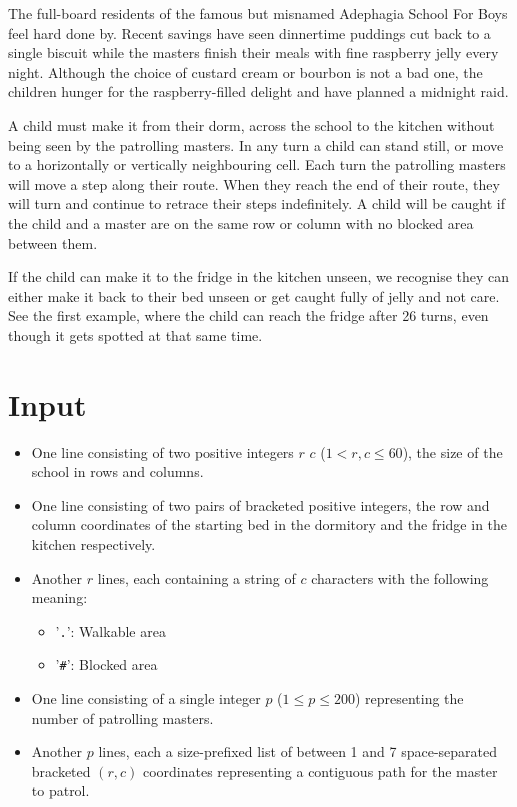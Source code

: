 
The full-board residents of the famous but misnamed Adephagia School For Boys feel
hard done by. Recent savings have seen dinnertime puddings cut back to a single
biscuit while the masters finish their meals with fine raspberry jelly every
night. Although the choice of custard cream or bourbon is not a bad one, the
children hunger for the raspberry-filled delight and have planned a midnight
raid.

A child must make it from their dorm, across the school to the kitchen without
being seen by the patrolling masters. In any turn a child can stand still, or
move to a horizontally or vertically neighbouring cell. Each turn the
patrolling masters will move a step along their route. When they reach the end
of their route, they will turn and continue to retrace their steps
indefinitely. A child will be caught if the child and a master are on the same
row or column with no blocked area between them.

If the child can make it to the fridge in the kitchen unseen, we recognise they
can either make it back to their bed unseen or get caught fully of jelly and
not care. See the first example, where the child can reach the fridge
after 26 turns, even though it gets spotted at that same time.

\section*{Input}

\begin{itemize}

\item One line consisting of two positive integers $r$ $c$ ($1 < r, c \leq 60$),
the size of the school in rows and columns.

\item One line consisting of two pairs of bracketed positive integers, the row
and column coordinates of the starting bed in the dormitory and the fridge in
the kitchen respectively.

\item Another $r$ lines, each containing a string of $c$ characters with the
following meaning:

\begin{itemize}
  \item '\texttt{.}': Walkable area
  \item '\texttt{\#}': Blocked area
\end{itemize}

\item One line consisting of a single integer $p$ ($1 \le p \le 200$)
representing the number of patrolling masters.

\item Another $p$ lines, each a size-prefixed list of between 1 and 7
space-separated bracketed $(r, c)$ coordinates representing a contiguous path
for the master to patrol.

\end{itemize}

